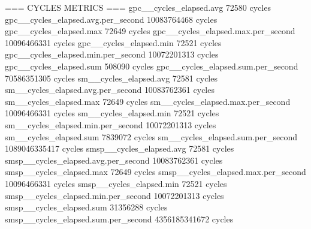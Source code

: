 === CYCLES METRICS ===
gpc__cycles_elapsed.avg                                                                    72580 cycles
gpc__cycles_elapsed.avg.per_second                                                   10083764468 cycles
gpc__cycles_elapsed.max                                                                    72649 cycles
gpc__cycles_elapsed.max.per_second                                                   10096466331 cycles
gpc__cycles_elapsed.min                                                                    72521 cycles
gpc__cycles_elapsed.min.per_second                                                   10072201313 cycles
gpc__cycles_elapsed.sum                                                                   508090 cycles
gpc__cycles_elapsed.sum.per_second                                                   70586351305 cycles
sm__cycles_elapsed.avg                                                                     72581 cycles
sm__cycles_elapsed.avg.per_second                                                    10083762361 cycles
sm__cycles_elapsed.max                                                                     72649 cycles
sm__cycles_elapsed.max.per_second                                                    10096466331 cycles
sm__cycles_elapsed.min                                                                     72521 cycles
sm__cycles_elapsed.min.per_second                                                    10072201313 cycles
sm__cycles_elapsed.sum                                                                   7839072 cycles
sm__cycles_elapsed.sum.per_second                                                  1089046335417 cycles
smsp__cycles_elapsed.avg                                                                   72581 cycles
smsp__cycles_elapsed.avg.per_second                                                  10083762361 cycles
smsp__cycles_elapsed.max                                                                   72649 cycles
smsp__cycles_elapsed.max.per_second                                                  10096466331 cycles
smsp__cycles_elapsed.min                                                                   72521 cycles
smsp__cycles_elapsed.min.per_second                                                  10072201313 cycles
smsp__cycles_elapsed.sum                                                                31356288 cycles
smsp__cycles_elapsed.sum.per_second                                                4356185341672 cycles

